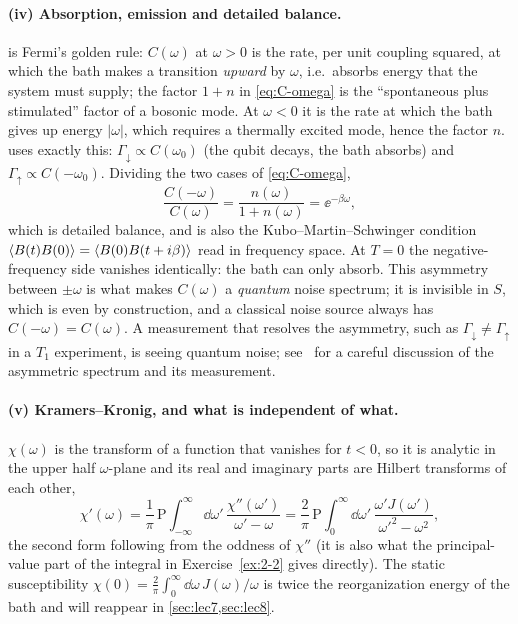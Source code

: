 \paragraph{(iv) Absorption, emission and detailed balance.}
 is Fermi's golden rule: $C(\omega)$ at $\omega>0$ is the rate, per unit coupling squared, at which the bath makes a transition \emph{upward} by $\omega$, i.e.\ absorbs energy that the system must supply; the factor $1+n$ in \cref{eq:C-omega} is the ``spontaneous plus stimulated'' factor of a bosonic mode.
At $\omega<0$ it is the rate at which the bath gives up energy $|\omega|$, which requires a thermally excited mode, hence the factor $n$.
 uses exactly this: $\Gamma_\downarrow\propto C(\omega_0)$ (the qubit decays, the bath absorbs) and $\Gamma_\uparrow\propto C(-\omega_0)$.
Dividing the two cases of \cref{eq:C-omega},
\begin{equation}
  \frac{C(-\omega)}{C(\omega)}=\frac{n(\omega)}{1+n(\omega)}=\ee^{-\beta\omega},
  \label{eq:detailed-balance}
\end{equation}
which is detailed balance, and is also the Kubo--Martin--Schwinger condition $\langle B(t)B(0)\rangle=\langle B(0)B(t+i\beta)\rangle$ read in frequency space.
At $T=0$ the negative-frequency side vanishes identically: the bath can only absorb.
This asymmetry between $\pm\omega$ is what makes $C(\omega)$ a \emph{quantum} noise spectrum; it is invisible in $S$, which is even by construction, and a classical noise source always has $C(-\omega)=C(\omega)$.
A measurement that resolves the asymmetry, such as $\Gamma_\downarrow\ne\Gamma_\uparrow$ in a $T_1$ experiment, is seeing quantum noise; see~\cite[Sec.~II]{ClerkRMP2010} for a careful discussion of the asymmetric spectrum and its measurement.

\paragraph{(v) Kramers--Kronig, and what is independent of what.}
$\chi(\omega)$ is the transform of a function that vanishes for $t<0$, so it is analytic in the upper half $\omega$-plane and its real and imaginary parts are Hilbert transforms of each other,
\begin{equation}
  \chi'(\omega)=\frac1\pi\,\mathrm{P}\!\!\int_{-\infty}^{\infty}\!\dd\omega'\,\frac{\chi''(\omega')}{\omega'-\omega}
  =\frac2\pi\,\mathrm{P}\!\!\int_{0}^{\infty}\!\dd\omega'\,\frac{\omega'J(\omega')}{\omega'^2-\omega^2},
  \label{eq:KK}
\end{equation}
the second form following from the oddness of $\chi''$ (it is also what the principal-value part of the integral in Exercise~\ref{ex:2-2} gives directly).
The static susceptibility $\chi(0)=\tfrac2\pi\int_0^\infty\dd\omega\,J(\omega)/\omega$ is twice the reorganization energy of the bath and will reappear in \cref{sec:lec7,sec:lec8}.

